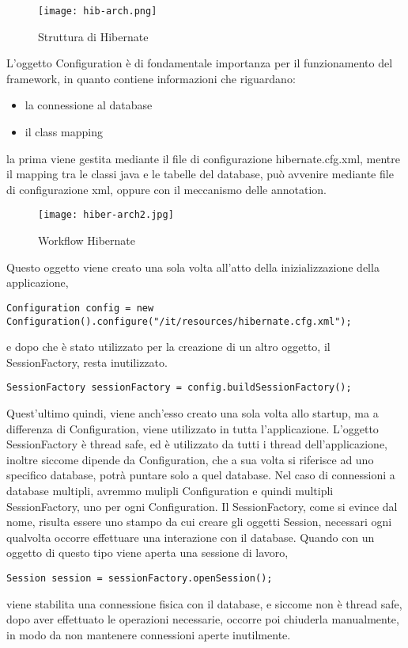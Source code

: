 \begin{figure}[htbp]
\centering%
\texttt{[image: hib-arch.png]}%
\caption{Struttura di Hibernate}\label{fig:hibernate}%
\end{figure}
L'oggetto Configuration \`e di fondamentale importanza per il funzionamento del framework, in quanto contiene informazioni che riguardano:
\begin{itemize}
\item la connessione al database
\item il class mapping
\end{itemize}
la prima viene gestita mediante il file di configurazione hibernate.cfg.xml, mentre il mapping tra le classi java e le tabelle del database, pu\`o avvenire mediante file di configurazione xml, oppure con il meccanismo delle annotation. 
\begin{figure}[htbp]
\centering%
\texttt{[image: hiber-arch2.jpg]}%
\caption{Workflow Hibernate}\label{fig:hibernate2}%
\end{figure}
Questo oggetto viene creato una sola volta all'atto della inizializzazione della applicazione,
\begin{lstlisting}
Configuration config = new Configuration().configure("/it/resources/hibernate.cfg.xml");
\end{lstlisting}
e dopo che \`e stato utilizzato per la creazione di un altro oggetto, il SessionFactory, resta inutilizzato.
\begin{lstlisting}
SessionFactory sessionFactory = config.buildSessionFactory();
\end{lstlisting}
Quest'ultimo quindi, viene anch'esso creato una sola volta allo startup, ma a differenza di Configuration, viene utilizzato in tutta l'applicazione. L'oggetto SessionFactory \`e thread safe, ed \`e utilizzato da tutti i thread dell'applicazione, inoltre siccome dipende da Configuration, che a sua volta si riferisce ad uno specifico database, potr\`a puntare solo a quel database. Nel caso di connessioni a database multipli, avremmo mulipli Configuration e quindi multipli SessionFactory, uno per ogni Configuration.
Il SessionFactory, come si evince dal nome, risulta essere uno stampo da cui creare gli oggetti Session, necessari ogni qualvolta occorre effettuare una interazione con il database. Quando con un oggetto di questo tipo viene aperta una sessione di lavoro,
\begin{lstlisting}
Session session = sessionFactory.openSession();
\end{lstlisting}
viene stabilita una connessione fisica con il database, e siccome non \`e thread safe, dopo aver effettuato le operazioni necessarie, occorre poi chiuderla manualmente, in modo da non mantenere connessioni aperte inutilmente.
